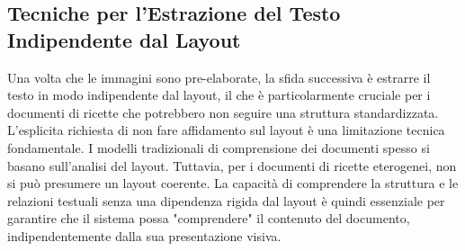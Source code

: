 \documentclass[a4paper, 11pt]{article}
\begin{document}
\subsection{Tecniche per l'Estrazione del Testo Indipendente dal Layout}

Una volta che le immagini sono pre-elaborate, la sfida successiva è estrarre il testo in modo indipendente dal layout, il che è particolarmente cruciale per i documenti di ricette che potrebbero non seguire una struttura standardizzata. L'esplicita richiesta di non fare affidamento sul layout è una limitazione tecnica fondamentale. I modelli tradizionali di comprensione dei documenti spesso si basano sull'analisi del layout. \cite{survey_deep_learning_ocr} Tuttavia, per i documenti di ricette eterogenei, non si può presumere un layout coerente. La capacità di comprendere la struttura e le relazioni testuali senza una dipendenza rigida dal layout è quindi essenziale per garantire che il sistema possa "comprendere" il contenuto del documento, indipendentemente dalla sua presentazione visiva.
\end{document}
